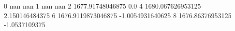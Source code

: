 0 nan nan
1 nan nan
2 1677.91748046875 0.0
4 1680.067626953125 2.150146484375
6 1676.9119873046875 -1.0054931640625
8 1676.86376953125 -1.0537109375
